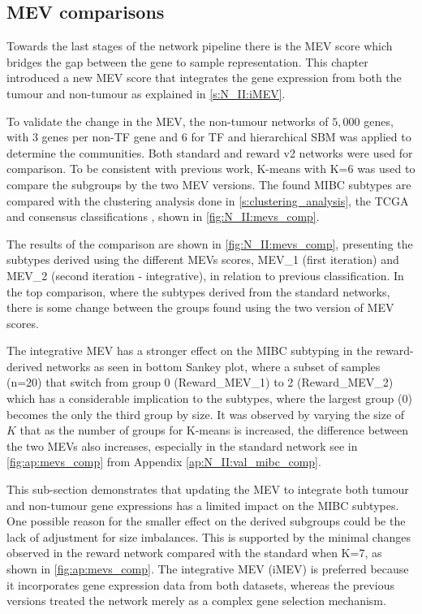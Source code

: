 \subsection{MEV comparisons} \label{s:N_II:mev_comp}

Towards the last stages of the network pipeline there is the MEV score which bridges the gap between the gene to sample representation. This chapter introduced a new MEV score that integrates the gene expression from both the tumour and non-tumour as explained in \cref{s:N_II:iMEV}.

To validate the change in the MEV, the non-tumour networks of $5,000$ genes, with $3$ genes per non-TF gene and $6$ for TF and hierarchical SBM was applied to determine the communities. Both standard and reward v2 networks were used for comparison. To be consistent with previous work, K-means with K=6 was used to compare the subgroups by the two MEV versions. The found MIBC subtypes are compared with the clustering analysis done in \cref{s:clustering_analysis}, the TCGA and consensus classifications \citet{Robertson2017-mg,Kamoun2020-tj}, shown in \cref{fig:N_II:mevs_comp}.


The results of the comparison are shown in \cref{fig:N_II:mevs_comp}, presenting the subtypes derived using the different MEVs scores, MEV\_1 (first iteration) and MEV\_2 (second iteration - integrative), in relation to previous classification. In the top comparison, where the subtypes derived from the standard networks, there is some change between the groups found using the two version of MEV scores.

The integrative MEV has a stronger effect on the MIBC subtyping in the reward-derived networks as seen in bottom Sankey plot, where a subset of samples (n=20) that switch from group 0 (Reward\_MEV\_1) to 2 (Reward\_MEV\_2) which has a considerable implication to the subtypes, where the largest group (0) becomes the only the third group by size. It was observed by varying the size of $K$ that as the number of groups for K-means is increased, the difference between the two MEVs also increases, especially in the standard network see in \cref{fig:ap:mevs_comp} from Appendix \cref{ap:N_II:val_mibc_comp}.  

This sub-section demonstrates that updating the MEV to integrate both tumour and non-tumour gene expressions has a limited impact on the MIBC subtypes. One possible reason for the smaller effect on the derived subgroups could be the lack of adjustment for size imbalances. This is supported by the minimal changes observed in the reward network compared with the standard when K=7, as shown in \cref{fig:ap:mevs_comp}. The integrative MEV (iMEV) is preferred because it incorporates gene expression data from both datasets, whereas the previous versions treated the network merely as a complex gene selection mechanism.


